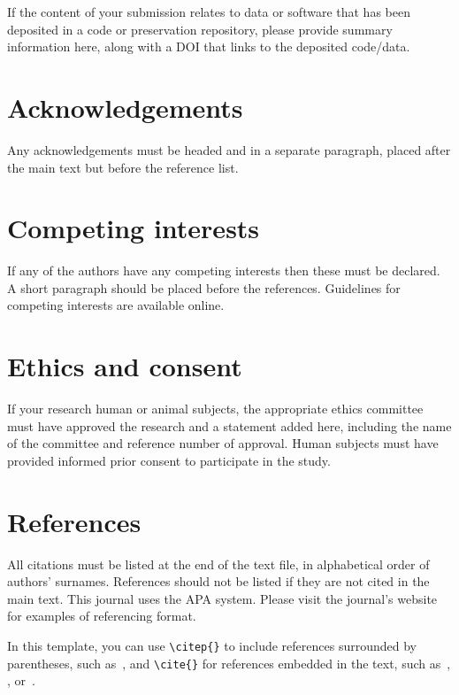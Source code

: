 \documentclass{article}
\begin{document}
If the content of your submission relates to data or software
that has been deposited in a code or preservation repository,
please provide summary information here, along with a DOI that
links to the deposited code/data.

\section{Acknowledgements}

Any acknowledgements must be headed and in a separate paragraph,
placed after the main text but before the reference list.

\section{Competing interests}

If any of the authors have any competing interests then these
must be declared. A short paragraph should be placed before
the references.
Guidelines for competing interests are available online.%

\section{Ethics and consent}

If your research human or animal subjects, the appropriate ethics
committee must have approved the research and a statement added here,
including the name of the committee and reference number of approval.
Human subjects must have provided informed prior consent
to participate in the study.

\section{References}

All citations must be listed at the end of the text file,
in alphabetical order of authors' surnames.
References should not be listed if they are not cited in
the main text.
This journal uses the APA system.
Please visit the journal's website
for examples of referencing format.

In this template, you can use \verb=\citep{}= to include references
surrounded by parentheses, such as~\citep{KneesS16_MusicSimilarityRetrieval_SPRINGER}, and \verb=\cite{}=
for references embedded in the text,
such as~\cite{WeihsJVR16_MusicDataAnalysis_CRC},
\cite{SerraEtAl13_RoadmapMIR_CreativeCommon},
or~\cite{Mueller15_FMP_SPRINGER}.
\end{document}
